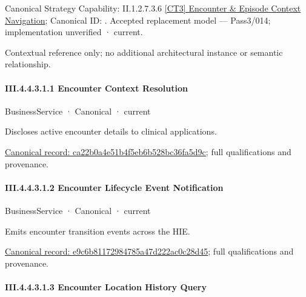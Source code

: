 {\small Canonical Strategy Capability: II.1.2.7.3.6 \hyperref[element:bfed62e152d742a3be947e824892064a]{[CT3] Encounter \& Episode Context Navigation}; Canonical ID: \texttt{}. Accepted replacement model — Pass3/014; implementation unverified · current.}\par
Contextual reference only; no additional architectural instance or semantic relationship.\par
\paragraph*{III.4.4.3.1.1 Encounter Context Resolution}
\label{navigation:III.4.4.3.1.1}

\label{element:ca22b0a4e51b4f5eb6b528bc36fa5d9c}
{\small BusinessService · Canonical · current}\par

Discloses active encounter details to clinical applications.


{\footnotesize \href{../../../../../../../../continuum/business/business-service/ca22b0a4e51b4f5eb6b528bc36fa5d9c.md}{Canonical record: ca22b0a4e51b4f5eb6b528bc36fa5d9c}; full qualifications and provenance.}\par
\paragraph*{III.4.4.3.1.2 Encounter Lifecycle Event Notification}
\label{navigation:III.4.4.3.1.2}

\label{element:e9c6b81172984785a47d222ac0c28d45}
{\small BusinessService · Canonical · current}\par

Emits encounter transition events across the HIE.


{\footnotesize \href{../../../../../../../../continuum/business/business-service/e9c6b81172984785a47d222ac0c28d45.md}{Canonical record: e9c6b81172984785a47d222ac0c28d45}; full qualifications and provenance.}\par
\paragraph*{III.4.4.3.1.3 Encounter Location History Query}
\label{navigation:III.4.4.3.1.3}

